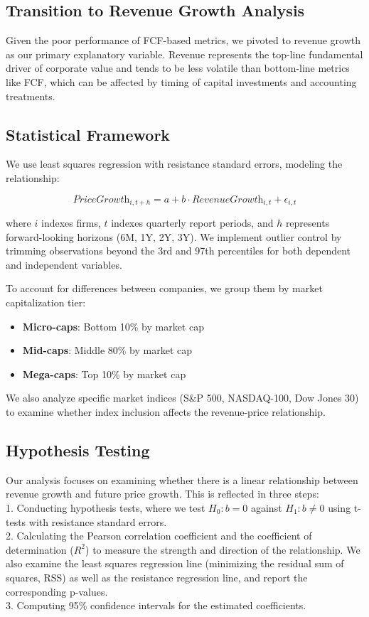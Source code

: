 \documentclass[11pt]{article}
\begin{document}
\subsection{Transition to Revenue Growth Analysis}

Given the poor performance of FCF-based metrics, we pivoted to revenue growth as our primary explanatory variable. Revenue represents the top-line fundamental driver of corporate value and tends to be less volatile than bottom-line metrics like FCF, which can be affected by timing of capital investments and accounting treatments.

\subsection{Statistical Framework}

We use least squares regression with resistance standard errors, modeling the relationship:

\begin{equation}
\textit{PriceGrowth}_{i,t+h} = a + b \cdot \textit{RevenueGrowth}_{i,t} + \epsilon_{i,t}
\end{equation}

where $i$ indexes firms, $t$ indexes quarterly report periods, and $h$ represents forward-looking horizons (6M, 1Y, 2Y, 3Y). We implement outlier control by trimming observations beyond the 3rd and 97th percentiles for both dependent and independent variables.

To account for differences between companies, we group them by market capitalization tier:
\begin{itemize}
\item \textbf{Micro-caps}: Bottom 10\% by market cap
\item \textbf{Mid-caps}: Middle 80\% by market cap  
\item \textbf{Mega-caps}: Top 10\% by market cap
\end{itemize}

We also analyze specific market indices (S\&P 500, NASDAQ-100, Dow Jones 30) to examine whether index inclusion affects the revenue-price relationship.

\subsection{Hypothesis Testing}

Our analysis focuses on examining whether there is a linear relationship between revenue growth and future price growth. This is reflected in three steps:  
\\ 1. Conducting hypothesis tests, where we test \( H_0: b = 0 \) against \( H_1: b \neq 0 \) using t-tests with resistance standard errors.
\\ 2. Calculating the Pearson correlation coefficient and the coefficient of determination (\(R^2\)) to measure the strength and direction of the relationship. We also examine the least squares regression line (minimizing the residual sum of squares, RSS) as well as the resistance regression line, and report the corresponding p-values.
\\ 3. Computing 95\% confidence intervals for the estimated coefficients.
\end{document}
